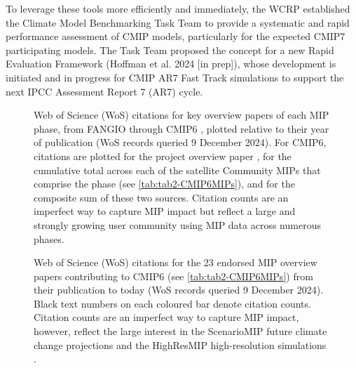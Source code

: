\documentclass[manuscript]{copernicus}
\begin{document}
{To leverage these tools more efficiently and immediately, the WCRP established the Climate Model Benchmarking Task Team to provide a systematic and rapid performance assessment of CMIP models, particularly for the expected CMIP7 participating models. The Task Team proposed the concept for a new Rapid Evaluation Framework (Hoffman et al. 2024 [in prep]), whose development is initiated and in progress for CMIP AR7 Fast Track simulations to support the next IPCC Assessment Report 7 (AR7) cycle.
}


\begin{figure}
    \centering
    
    \caption{Web of Science (WoS) citations for key overview papers of each MIP phase, from FANGIO \citep{cess_intercomparison_1990} through CMIP6 \citep{eyring_overview_2016}, plotted relative to their year of publication (WoS records queried 9 December 2024). For CMIP6, citations are plotted for the project overview paper \citep{eyring_overview_2016}, for the cumulative total across each of the satellite Community MIPs that comprise the phase (see \autoref{tab:tab2-CMIP6MIPs}), and for the composite sum of these two sources. Citation counts are an imperfect way to capture MIP impact but reflect a large and strongly growing user community using MIP data across numerous phases.}
    \label{fig:fig3-MIPPhaseCitations}
\end{figure}


\begin{figure}
    \centering
    
    \caption{Web of Science (WoS) citations for the 23 endorsed MIP overview papers contributing to CMIP6 (see \autoref{tab:tab2-CMIP6MIPs}) from their publication to today (WoS records queried 9 December 2024). Black text numbers on each coloured bar denote citation counts. Citation counts are an imperfect way to capture MIP impact, however, reflect the large interest in the ScenarioMIP future climate change projections \citep{oneill_scenario_2016} and the HighResMIP high-resolution simulations \citep{haarsma_high_2016}.}
    \label{fig:fig4-MIPCitations}
\end{figure}
\end{document}
